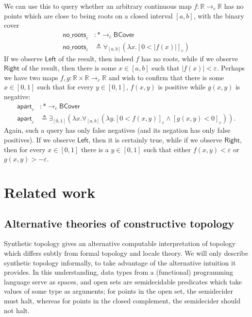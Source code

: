 \documentclass[conference]{IEEEtran}
\newcommand{\cto}{\to_c}
\newcommand{\R}{\mathbb{R}}
\newcommand{\One}{\ast}
\newcommand{\BCover}{\mathsf{BCover}}
\begin{document}
We can use this to query whether an arbitrary continuous map $f : \R \cto \R$ has no points which are close to being roots on a closed interval $[a, b]$, with the binary cover
\begin{align*}
\mathsf{no\_roots}_{\varepsilon} &: \One \cto \BCover
\\ \mathsf{no\_roots}_\varepsilon &\triangleq
  \forall_{[a,b]}(\lambda x. [ 0 < |f(x)| ]_\varepsilon)
\end{align*}
If we observe $\mathsf{Left}$ of the result, then indeed $f$ has no roots, while if we observe $\mathsf{Right}$ of the result, then there is some $x \in [a, b]$ such that $|f(x)| < \varepsilon$. Perhaps we have two maps $f, g : \R \times \R \cto \R$ and wish to confirm that there is some $x \in [0,1]$ such that for every $y \in [0,1]$, $f(x, y)$ is positive while $g(x,y)$ is negative:
\begin{align*}
\mathsf{apart}_{\varepsilon} &: \One \cto \BCover
\\ \mathsf{apart}_\varepsilon &\triangleq
  \exists_{[0,1]}(\lambda x. \forall_{[a,b]}(\lambda y. [ 0 < f(x, y) ]_\varepsilon \wedge [g(x, y) < 0]_\varepsilon)).
\end{align*}
Again, such a query has only false negatives (and its negation has only false positives). If we observe $\mathsf{Left}$, then it is certainly true, while if we observe $\mathsf{Right}$, then for every $x \in [0,1]$ there is a $y \in [0,1]$ such that either $f(x, y) < \varepsilon$ or $g(x, y) > -\varepsilon$.

\section{Related work}

\subsection{Alternative theories of constructive topology}

Synthetic topology gives an alternative computable interpretation of topology which differs subtly from formal topology and locale theory\cite{escardo2004, lesnik}. We will only describe synthetic topology informally, to take advantage of the alternative intuition it provides. In this understanding, data types from a (functional) programming language serve as spaces, and open sets are semidecidable predicates which take values of some type as arguments; for points in the open set, the semidecider must halt, whereas for points in the closed complement, the semidecider should not halt.
\end{document}
